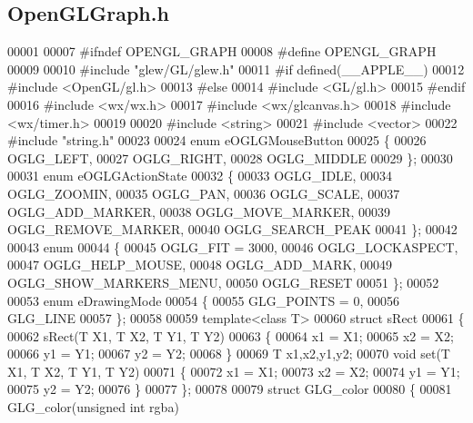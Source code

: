 \subsection{Open\+G\+L\+Graph.\+h}
\label{OpenGLGraph_8h_source}

\begin{DoxyCode}
00001 
00007 \textcolor{preprocessor}{#ifndef OPENGL\_GRAPH}
00008 \textcolor{preprocessor}{#define OPENGL\_GRAPH}
00009 
00010 \textcolor{preprocessor}{#include "glew/GL/glew.h"}
00011 \textcolor{preprocessor}{#if defined(\_\_APPLE\_\_)}
00012 \textcolor{preprocessor}{#include <OpenGL/gl.h>}
00013 \textcolor{preprocessor}{#else}
00014 \textcolor{preprocessor}{#include <GL/gl.h>}
00015 \textcolor{preprocessor}{#endif}
00016 \textcolor{preprocessor}{#include <wx/wx.h>}
00017 \textcolor{preprocessor}{#include <wx/glcanvas.h>}
00018 \textcolor{preprocessor}{#include <wx/timer.h>}
00019 
00020 \textcolor{preprocessor}{#include <string>}
00021 \textcolor{preprocessor}{#include <vector>}
00022 \textcolor{preprocessor}{#include "string.h"}
00023 
00024 \textcolor{keyword}{enum} eOGLGMouseButton
00025 \{
00026     OGLG_LEFT,
00027     OGLG_RIGHT,
00028     OGLG_MIDDLE
00029 \};
00030 
00031 \textcolor{keyword}{enum} eOGLGActionState
00032 \{
00033     OGLG_IDLE,
00034     OGLG_ZOOMIN,
00035     OGLG_PAN,
00036     OGLG_SCALE,
00037     OGLG_ADD_MARKER,
00038     OGLG_MOVE_MARKER,
00039     OGLG_REMOVE_MARKER,
00040     OGLG_SEARCH_PEAK
00041 \};
00042 
00043 \textcolor{keyword}{enum}
00044 \{
00045     OGLG_FIT = 3000,
00046     OGLG_LOCKASPECT,
00047     OGLG_HELP_MOUSE,
00048     OGLG_ADD_MARK,
00049     OGLG_SHOW_MARKERS_MENU,
00050     OGLG_RESET
00051 \};
00052 
00053 \textcolor{keyword}{enum} eDrawingMode
00054 \{
00055     GLG_POINTS = 0,
00056     GLG_LINE
00057 \};
00058 
00059 \textcolor{keyword}{template}<\textcolor{keyword}{class} T>
00060 \textcolor{keyword}{struct }sRect
00061 \{
00062     sRect(T X1, T X2, T Y1, T Y2)
00063     \{
00064         x1 = X1;
00065         x2 = X2;
00066         y1 = Y1;
00067         y2 = Y2;
00068     \}
00069     T x1,x2,y1,y2;
00070     \textcolor{keywordtype}{void} \textcolor{keyword}{set}(T X1, T X2, T Y1, T Y2)
00071     \{
00072         x1 = X1;
00073         x2 = X2;
00074         y1 = Y1;
00075         y2 = Y2;
00076     \}
00077 \};
00078 
00079 \textcolor{keyword}{struct }GLG_color
00080 \{
00081     GLG_color(\textcolor{keywordtype}{unsigned} \textcolor{keywordtype}{int} rgba)

\end{DoxyCode}
